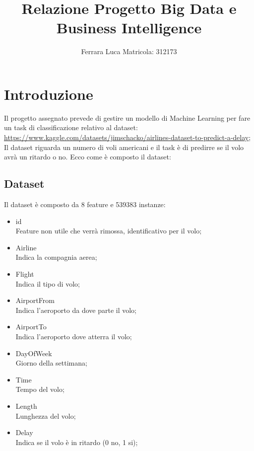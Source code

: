 \documentclass{article}
\begin{document}
\title{Relazione Progetto Big Data e Business Intelligence}
\author{Ferrara Luca  Matricola: 312173}
\maketitle
\pagebreak
\tableofcontents
\pagebreak
\section{Introduzione}
Il progetto assegnato prevede di gestire un modello di Machine Learning per fare un task di classificazione relativo al dataset: \url{https://www.kaggle.com/datasets/jimschacko/airlines-dataset-to-predict-a-delay}; \\
Il dataset riguarda un numero di voli americani e il task è di predirre se il volo avrà un ritardo o no.  Ecco come è composto il dataset:
\subsection{Dataset}
Il dataset è composto da 8 feature e 539383 instanze:
\begin{itemize}
\item id \\
Feature non utile che verrà rimossa, identificativo per il volo;
\item Airline \\
Indica la compagnia aerea;
\item Flight \\
Indica il tipo di volo;
\item AirportFrom \\
Indica l'aeroporto da dove parte il volo;
\item AirportTo \\
Indica l'aeroporto dove atterra il volo;
\item DayOfWeek \\
Giorno della settimana;
\item Time \\
Tempo del volo;
\item Length \\
Lunghezza del volo;
\item Delay \\
Indica se il volo è in ritardo (0 no, 1 si);
\end{itemize}
\end{document}
